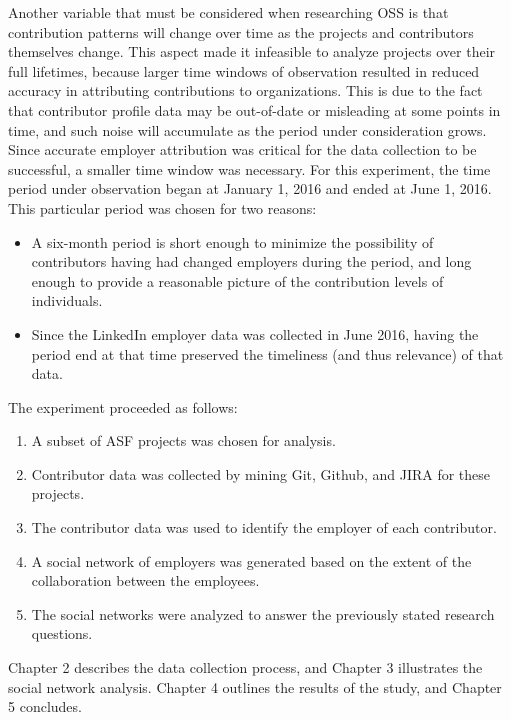 Another variable that must be considered when researching OSS is that contribution patterns will change over time as the projects and contributors themselves change. This aspect made it infeasible to analyze projects over their full lifetimes, because larger time windows of observation resulted in reduced accuracy in attributing contributions to organizations. This is due to the fact that contributor profile data may be out-of-date or misleading at some points in time, and such noise will accumulate as the period under consideration grows. Since accurate employer attribution was critical for the data collection to be successful, a smaller time window was necessary. For this experiment, the time period \timeperiod{} under observation began at January 1, 2016 and ended at June 1, 2016. This particular period was chosen for two reasons:
\begin{itemize}
	\item A six-month period is short enough to minimize the possibility of contributors having had changed employers during the period, and long enough to provide a reasonable picture of the contribution levels of individuals.
	\item Since the LinkedIn employer data was collected in June 2016, having the period end at that time preserved the timeliness (and thus relevance) of that data.
\end{itemize}

The experiment proceeded as follows:
\begin{enumerate}
	\item A subset of ASF projects was chosen for analysis.
	\item Contributor data was collected by mining Git, Github, and JIRA for these projects.
	\item The contributor data was used to identify the employer of each contributor.
	\item A social network of employers was generated based on the extent of the collaboration between the employees.
	\item The social networks were analyzed to answer the previously stated research questions.
\end{enumerate}
Chapter 2 describes the data collection process, and Chapter 3 illustrates the social network analysis. Chapter 4 outlines the results of the study, and Chapter 5 concludes.
